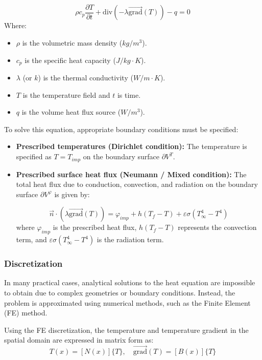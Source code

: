\documentclass[a4paper,12pt,twoside]{report}     %
\begin{document}
\begin{equation}
    \rho c_p \frac{\partial T}{\partial t} + \text{div}(-\lambda \overrightarrow{\text{grad}}(T)) - q = 0
\end{equation}
Where:
\begin{itemize}
    \item $\rho$ is the volumetric mass density ($kg/m^3$).
    \item $c_p$ is the specific heat capacity ($J/kg \cdot K$).
    \item $\lambda$ (or $k$) is the thermal conductivity ($W/m \cdot K$).
    \item $T$ is the temperature field and $t$ is time.
    \item $q$ is the volume heat flux source ($W/m^3$).
\end{itemize}

To solve this equation, appropriate boundary conditions must be specified:
\begin{itemize}
    \item \textbf{Prescribed temperatures (Dirichlet condition):} The temperature is specified as $T = T_{imp}$ on the boundary surface $\partial V^T$.
    \item \textbf{Prescribed surface heat flux (Neumann / Mixed condition):} The total heat flux due to conduction, convection, and radiation on the boundary surface $\partial V^\varphi$ is given by:

    \begin{equation}
        \vec{n} \cdot (\lambda \overrightarrow{\text{grad}}(T)) = \varphi_{imp} + h(T_f - T) + \varepsilon \sigma (T_\infty^4 - T^4)
    \end{equation}
    where $\varphi_{imp}$ is the prescribed heat flux, $h(T_f - T)$ represents the convection term, and $\varepsilon \sigma (T_\infty^4 - T^4)$ is the radiation term.
\end{itemize}

\subsubsection{Discretization}
In many practical cases, analytical solutions to the heat equation are impossible to obtain due to complex geometries or boundary conditions. Instead, the problem is approximated using numerical methods, such as the Finite Element (FE) method. 

Using the FE discretization, the temperature and temperature gradient in the spatial domain are expressed in matrix form as:
\begin{equation}
    T(x) = [N(x)]\{T\}, \quad \overrightarrow{\text{grad}}(T) = [B(x)]\{T\}
\end{equation}
\end{document}
